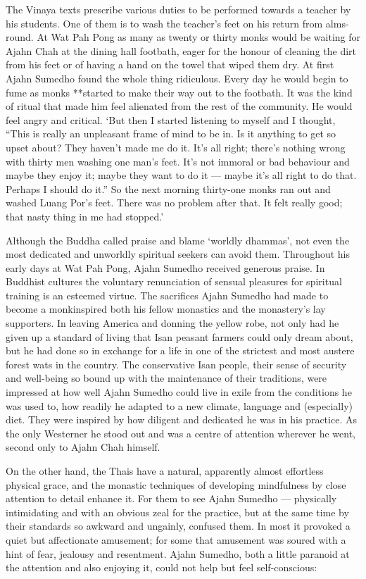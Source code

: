 The Vinaya texts prescribe various duties to be performed towards a
teacher by his students. One of them is to wash the teacher's feet on
his return from alms-round. At Wat Pah Pong as many as twenty or thirty
monks would be waiting for Ajahn Chah at the dining hall footbath, eager
for the honour of cleaning the dirt from his feet or of having a hand on
the towel that wiped them dry. At first Ajahn Sumedho found the whole
thing ridiculous. Every day he would begin to fume as monks **started to
make their way out to the footbath. It was the kind of ritual that made
him feel alienated from the rest of the community. He would feel angry
and critical. `But then I started listening to myself and I thought,
``This is really an unpleasant frame of mind to be in. Is it anything to
get so upset about? They haven't made me do it. It's all right; there's
nothing wrong with thirty men washing one man's feet. It's not immoral
or bad behaviour and maybe they enjoy it; maybe they want to do it ---
maybe it's all right to do that. Perhaps I should do it.'' So the next
morning thirty-one monks ran out and washed Luang Por's feet. There was
no problem after that. It felt really good; that nasty thing in me had
stopped.'

Although the Buddha called praise and blame `worldly dhammas', not even
the most dedicated and unworldly spiritual seekers can avoid them.
Throughout his early days at Wat Pah Pong, Ajahn Sumedho received
generous praise. In Buddhist cultures the voluntary renunciation of
sensual pleasures for spiritual training is an esteemed virtue. The
sacrifices Ajahn Sumedho had made to become a monkinspired both his
fellow monastics and the monastery's lay supporters. In leaving America
and donning the yellow robe, not only had he given up a standard of
living that Isan peasant farmers could only dream about, but he had done
so in exchange for a life in one of the strictest and most austere
forest wats in the country. The conservative Isan people, their sense of
security and well-being so bound up with the maintenance of their
traditions, were impressed at how well Ajahn Sumedho could live in exile
from the conditions he was used to, how readily he adapted to a new
climate, language and (especially) diet. They were inspired by how
diligent and dedicated he was in his practice. As the only Westerner he
stood out and was a centre of attention wherever he went, second only to
Ajahn Chah himself.

On the other hand, the Thais have a natural, apparently almost
effortless physical grace, and the monastic techniques of developing
mindfulness by close attention to detail enhance it. For them to see
Ajahn Sumedho --- physically intimidating and with an obvious zeal for
the practice, but at the same time by their standards so awkward and
ungainly, confused them. In most it provoked a quiet but affectionate
amusement; for some that amusement was soured with a hint of fear,
jealousy and resentment. Ajahn Sumedho, both a little paranoid at the
attention and also enjoying it, could not help but feel self-conscious:

